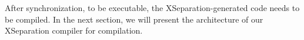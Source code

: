 
After synchronization, to be executable, the XSeparation-generated code needs to be compiled.
In the next section, we will present the architecture of our XSeparation compiler for compilation. 






